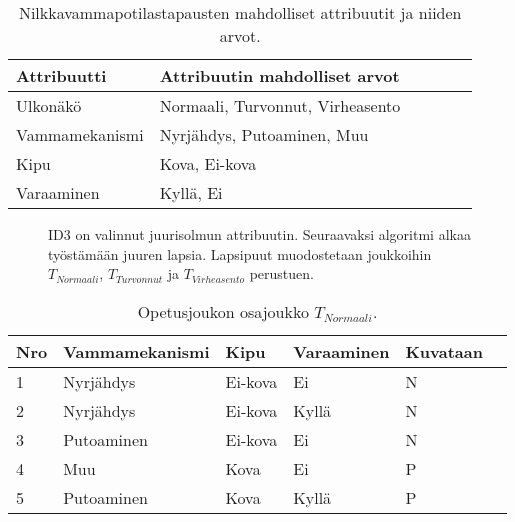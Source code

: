 \documentclass[12pt,finnish]{tktltiki2}
\theoremstyle{definition}
\theoremstyle{remark}
\begin{document}
\begin{table}
\centering
\begin{tabular}[H]{ | l | l | l | l | l | p{2cm} |} \hline
    \textbf{Attribuutti} & \textbf{Attribuutin mahdolliset arvot} \\ \hline
    Ulkonäkö & Normaali, Turvonnut, Virheasento \\ \hline
    Vammamekanismi & Nyrjähdys, Putoaminen, Muu \\ \hline
    Kipu & Kova, Ei-kova \\ \hline
    Varaaminen & Kyllä, Ei \\ \hline
\end{tabular} 
\caption{Nilkkavammapotilastapausten mahdolliset attribuutit ja niiden arvot.}
\label{table:NilkkavammapotilastapautenAttribuutitJaArvot}
\end{table}

\begin{figure}
\centering
{}
\caption{ID3 on valinnut juurisolmun attribuutin. Seuraavaksi algoritmi alkaa työstämään juuren lapsia.
Lapsipuut muodostetaan joukkoihin $T_{Normaali}$, $T_{Turvonnut}$ ja $T_{Virheasento}$ perustuen.}
\label{fig:NilkkavammaPaatospuuJuuri}
\end{figure}



\begin{table}
\centering
    \begin{tabular}{ | l | l | l | l | l | p{2cm} |} \hline
    \textbf{Nro} & \textbf{Vammamekanismi} & \textbf{Kipu} & \textbf{Varaaminen} & \textbf{Kuvataan} \\ \hline
    1 & Nyrjähdys & Ei-kova & Ei & N \\ \hline
    2 & Nyrjähdys & Ei-kova & Kyllä & N \\ \hline
    3 & Putoaminen & Ei-kova & Ei & N \\ \hline
    4 & Muu & Kova & Ei & P \\ \hline
    5 & Putoaminen & Kova & Kyllä & P \\ \hline
    \end{tabular}
\caption{Opetusjoukon osajoukko $T_{Normaali}$.}
\label{table:OsajoukkoTNormaali}
\end{table}
\end{document}

